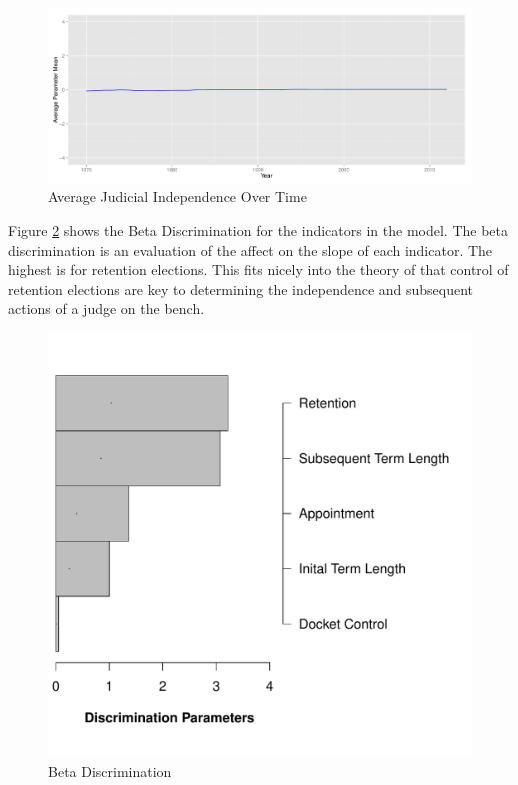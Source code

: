 \documentclass[12pt]{article}
\begin{document}
\begin{figure}[!tbh]
\centering
\caption{Average Judicial Independence Over Time}
\label{fig:meanavgtime}
\includegraphics[width=0.7\linewidth]{graphics/fiveind/meanavgtime}
\end{figure}

Figure \ref{fig:FiveBetaDiscrimination} shows the Beta Discrimination for the indicators in the model.  The beta discrimination is an evaluation of the affect on the slope of each indicator.  The highest is for retention elections.  This fits nicely into the theory of \citet{Choi2010} that control of retention elections are key to determining the independence and subsequent actions of a judge on the bench.

\begin{figure}[tbh]
\centering
\caption{Beta Discrimination}
\label{fig:FiveBetaDiscrimination}
\includegraphics[width=0.7\linewidth]{graphics/fiveind/FiveBetaDiscrimination}
\end{figure}
\end{document}
